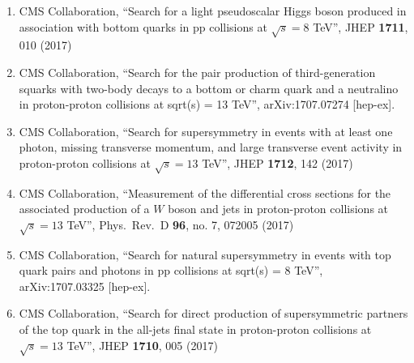 \begin{enumerate}
\item CMS Collaboration, ``Search for a light pseudoscalar Higgs boson produced in association with bottom quarks in pp collisions at $ \sqrt{s}=8 $ TeV'', JHEP {\bf 1711}, 010 (2017)

\item CMS Collaboration, ``Search for the pair production of third-generation squarks with two-body decays to a bottom or charm quark and a neutralino in proton-proton collisions at sqrt(s) = 13 TeV'', arXiv:1707.07274 [hep-ex].

\item CMS Collaboration, ``Search for supersymmetry in events with at least one photon, missing transverse momentum, and large transverse event activity in proton-proton collisions at $ \sqrt{s}=13 $ TeV'', JHEP {\bf 1712}, 142 (2017)

\item CMS Collaboration, ``Measurement of the differential cross sections for the associated production of a $W$ boson and jets in proton-proton collisions at $\sqrt{s}=13$ TeV'', Phys.\ Rev.\ D {\bf 96}, no. 7, 072005 (2017)

\item CMS Collaboration, ``Search for natural supersymmetry in events with top quark pairs and photons in pp collisions at sqrt(s) = 8 TeV'', arXiv:1707.03325 [hep-ex].

\item CMS Collaboration, ``Search for direct production of supersymmetric partners of the top quark in the all-jets final state in proton-proton collisions at $ \sqrt{s}=13 $ TeV'', JHEP {\bf 1710}, 005 (2017)


\end{enumerate}
